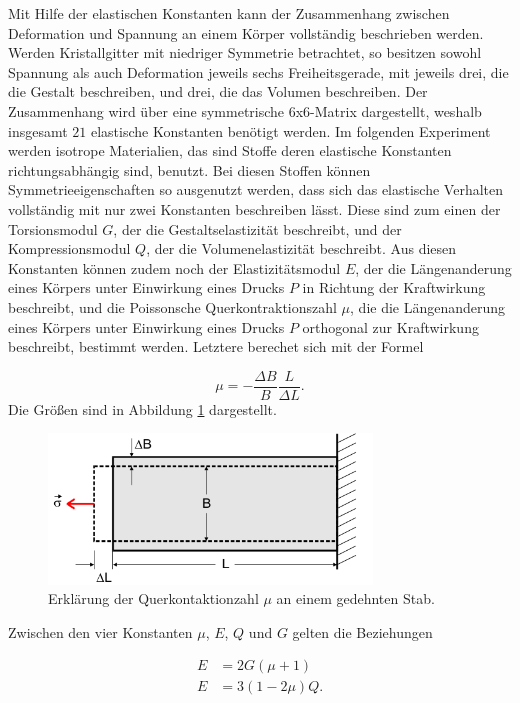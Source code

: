Mit Hilfe der elastischen Konstanten kann der Zusammenhang zwischen
Deformation und Spannung an einem Körper vollständig beschrieben werden.
Werden Kristallgitter mit niedriger Symmetrie betrachtet, so besitzen sowohl
Spannung als auch Deformation jeweils sechs Freiheitsgerade, mit jeweils
drei, die die Gestalt beschreiben, und drei, die das Volumen beschreiben.
Der Zusammenhang wird über eine symmetrische 6x6-Matrix dargestellt,
weshalb insgesamt $21$ elastische Konstanten benötigt werden.
Im folgenden Experiment werden isotrope Materialien, das sind Stoffe deren
elastische Konstanten richtungsabhängig sind, benutzt.
Bei diesen Stoffen können Symmetrieeigenschaften so ausgenutzt werden,
dass sich das elastische Verhalten vollständig mit nur zwei Konstanten
beschreiben lässt.
Diese sind zum einen der Torsionsmodul $G$, der die
Gestaltselastizität beschreibt, und
der Kompressionsmodul $Q$, der die Volumenelastizität beschreibt.
Aus diesen Konstanten können zudem noch der Elastizitätsmodul $E$, der die
Längenanderung eines Körpers unter Einwirkung eines Drucks $P$ in Richtung
der Kraftwirkung beschreibt, und die Poissonsche Querkontraktionszahl $\mu$,
die die Längenanderung eines Körpers unter Einwirkung eines Drucks $P$
orthogonal zur Kraftwirkung beschreibt, bestimmt werden.
Letztere berechet sich mit der Formel

\begin{equation}
  \mu = - \frac{\Delta B}{B} \frac{L}{\Delta L}.
  \label{eqn:Querkontraktionszahl}
\end{equation}
Die Größen sind in Abbildung \ref{fig:Querkontra} dargestellt.

\begin{figure}
  \centering
  \includegraphics[height=4cm]{Querkontraktion.png}
  \caption{Erklärung der Querkontaktionzahl $\mu$ an einem gedehnten Stab.}
  \label{fig:Querkontra}
\end{figure}

Zwischen den vier Konstanten $\mu$, $E$, $Q$
und $G$ gelten die Beziehungen

\begin{align}
  E & = 2G(\mu + 1) \\
  E & = 3(1 - 2\mu)Q.
\end{align}


